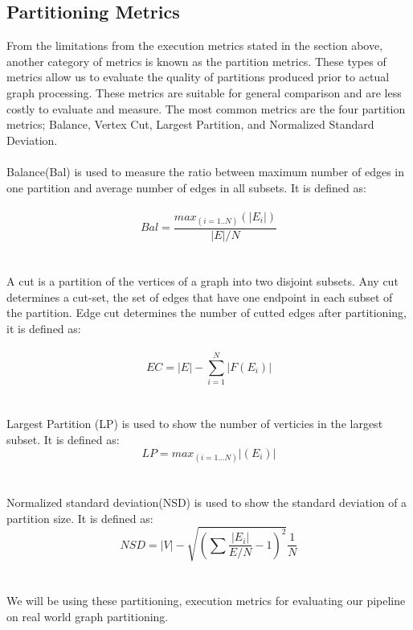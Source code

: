 \subsection{Partitioning Metrics}
From the limitations from the execution metrics stated in the section above, another category of metrics is known as the partition metrics. These types of metrics allow us to evaluate the quality of partitions produced prior to actual graph processing. These metrics are suitable for general comparison and are less costly to evaluate and measure. The most common metrics are the four partition metrics; Balance, Vertex Cut, Largest Partition, and Normalized Standard Deviation. \\ \\
Balance(Bal) is used to measure the ratio between maximum number of edges in one partition and average number of edges in all subsets. It is defined as: \\\\
\begin{equation} \label{eu_eqn}
Bal = \frac{max_(i=1..N)(|E_i|)}{|E|/N}
\end{equation}
\\\\
A cut is a partition of the vertices of a graph into two disjoint subsets. Any cut determines a cut-set, the set of edges that have one endpoint in each subset of the partition. Edge cut determines the number of cutted edges after partitioning, it is defined as: \\\\
\begin{equation} \label{eu_eqn}
EC = |E| - \sum_{i=1}^{N} |F(E_i)|
\end{equation}
\\\\
Largest Partition (LP) is used to show the number of verticies in the largest subset. It is defined as: 
\begin{equation} \label{eu_eqn}
LP = max_(i=1...N) |(E_i)|
\end{equation}
\\
\\
Normalized standard deviation(NSD) is used to show the standard deviation of a partition size. It is defined as:
\begin{equation} \label{eu_eqn}
NSD = |V| - \sqrt{(\sum\frac{|E_i|}{E/N}-1)^2} \frac{1}{N}
\end{equation}
\\\\
We will be using these partitioning, execution metrics for evaluating our pipeline on real world graph partitioning. 

